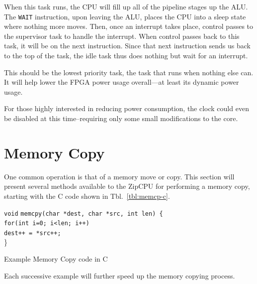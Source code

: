 \documentclass{gqtekspec}
\begin{document}
When this task runs, the CPU will fill up all of the pipeline stages up the
ALU.  The {\tt WAIT} instruction, upon leaving the ALU, places the CPU into
a sleep state where nothing more moves.  Then, once an interrupt takes place,
control passes to the supervisor task to handle the interrupt.  When control
passes back to this task, it will be on the next instruction.  Since that next
instruction sends us back to the top of the task, the idle task thus does
nothing but wait for an interrupt.

This should be the lowest priority task, the task that runs when nothing else
can.  It will help lower the FPGA power usage overall---at least its dynamic
power usage.

For those highly interested in reducing power consumption, the clock could
even be disabled at this time--requiring only some small modifications to the
core.

\section{Memory Copy}
One common operation is that of a memory move or copy.  This section will
present several methods available to the ZipCPU for performing a memory
copy, starting with the C code shown in Tbl.~\ref{tbl:memcp-c}.
\begin{table}\begin{center}
\parbox{4in}{\begin{tabbing}
{\tt void} \= {\tt memcpy(char *dest, char *src, int len) \{} \\
	\> {\tt for(int i=0; i<len; i++)} \\
	\> \hspace{0.2in} {\tt *dest++ = *src++;} \\
\}
\end{tabbing}}
\caption{Example Memory Copy code in C}\label{tbl:memcp-c}
\end{center}\end{table}
Each successive example will further speed up the memory copying process.
\end{document}
